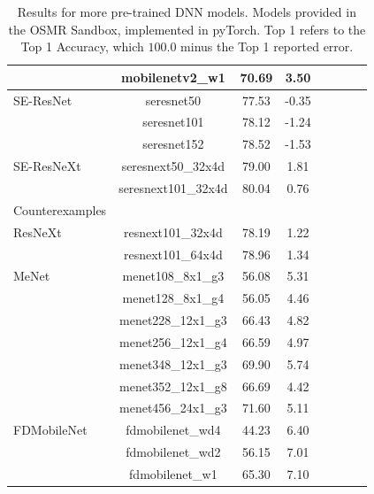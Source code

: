 {\begin{table}[!htb]
\begin{center}
\begin{tabular}{|p{1in}|c|c|c|c|c|c|c|}
& mobilenetv2\_w1 & 70.69 & 3.50 \\
\hline
SE-ResNet
& seresnet50 & 77.53 & -0.35 \\
& seresnet101 & 78.12 & -1.24 \\
& seresnet152 & 78.52 & -1.53 \\
\hline
SE-ResNeXt
& seresnext50\_32x4d & 79.00 & 1.81 \\
& seresnext101\_32x4d & 80.04 & 0.76 \\
\hline
Counterexamples & & &  \\
\hline
ResNeXt
& resnext101\_32x4d & 78.19 & 1.22 \\
& resnext101\_64x4d & 78.96 & 1.34 \\
\hline
MeNet
& menet108\_8x1\_g3 & 56.08 & 5.31 \\
& menet128\_8x1\_g4 & 56.05 & 4.46 \\
& menet228\_12x1\_g3 & 66.43 & 4.82 \\
& menet256\_12x1\_g4 & 66.59 & 4.97 \\
& menet348\_12x1\_g3 & 69.90 & 5.74 \\
& menet352\_12x1\_g8 & 66.69 & 4.42 \\
& menet456\_24x1\_g3 & 71.60 & 5.11 \\
\hline
FDMobileNet
& fdmobilenet\_wd4 & 44.23 & 6.40 \\
& fdmobilenet\_wd2 & 56.15 & 7.01 \\
& fdmobilenet\_w1 & 65.30 & 7.10 \\
\hline
\end{tabular}
\end{center}
\caption{Results for more pre-trained DNN models.  Models provided in the OSMR Sandbox, implemented in pyTorch. Top 1 refers to the Top 1 Accuracy, which $100.0$ minus the Top 1 reported error.}
\label{table:models_more}
\end{table}


}

